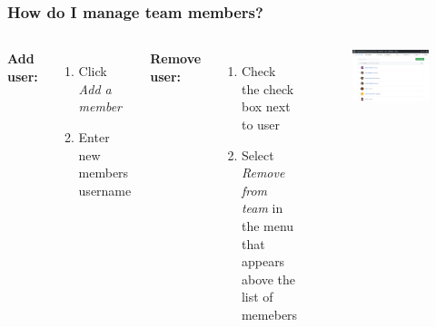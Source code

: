 \documentclass[aspectratio=169]{beamer} %
\begin{document}
\begin{frame}
	\frametitle{How do I manage team members?}
	\begin{columns}[c]
		
		\textbf{Add user:}
		\begin{enumerate}
			\item Click \textit{Add a member}
			\item Enter new members username
		\end{enumerate}

		\textbf{Remove user:}
		\begin{enumerate}
			\item Check the check box next to user
			\item Select \textit{Remove from team} in the menu that appears above the list of memebers
		\end{enumerate}


		\begin{figure}
			\centering
			\includegraphics[width=1\linewidth]{./img/who-is-team-maintainer}
		\end{figure}
	\end{columns}
\end{frame}


\end{document}
